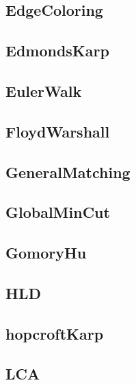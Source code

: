 \subsection{EdgeColoring}
\raggedbottom
\hrulefill
\subsection{EdmondsKarp}
\raggedbottom
\hrulefill
\subsection{EulerWalk}
\raggedbottom
\hrulefill
\subsection{FloydWarshall}
\raggedbottom
\hrulefill
\subsection{GeneralMatching}
\raggedbottom
\hrulefill
\subsection{GlobalMinCut}
\raggedbottom
\hrulefill
\subsection{GomoryHu}
\raggedbottom
\hrulefill
\subsection{HLD}
\raggedbottom
\hrulefill
\subsection{hopcroftKarp}
\raggedbottom
\hrulefill
\subsection{LCA}
\raggedbottom
\hrulefill
